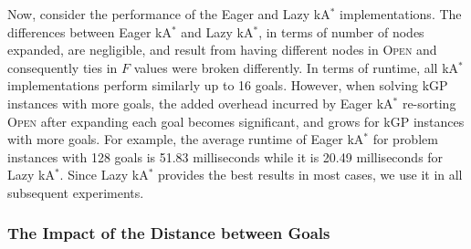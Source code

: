 \documentclass[smallextended]{svjour3}       %
\newcommand{\astar}{A$^*$\xspace}
\newcommand{\kastar}{kA$^*$\xspace}
\newcommand{\kastarvar}[1]{\textup{kA}$^*_{#1}$\xspace}
\newcommand{\kastarmin}{\kastarvar{\min}}
\newcommand{\kastarmax}{\kastarvar{\max}}
\newcommand{\kxastar}{k$\times$A$^*$\xspace}
\newcommand{\open}{\textsc{Open}\xspace}
\begin{document}
Now, consider the performance of the Eager and Lazy \kastar implementations. 
The differences between Eager \kastar and Lazy \kastar, in terms of number of nodes expanded, are negligible, and result from having different nodes in \open and consequently ties in $F$ values were broken differently. In terms of runtime, all \kastar implementations perform similarly up to 16 goals. However, when solving \ac{kGP} instances with more goals, the added overhead incurred by Eager \kastar re-sorting \open after expanding each goal becomes significant, and grows for \ac{kGP} instances with more goals. For example, the average runtime of Eager \kastar for problem instances with 128 goals is 51.83 milliseconds while it is 20.49 milliseconds for Lazy \kastar. 
Since Lazy \kastar provides the best results in most cases, we use it in all subsequent experiments. 









\subsubsection{The Impact of the Distance between Goals}
\end{document}
